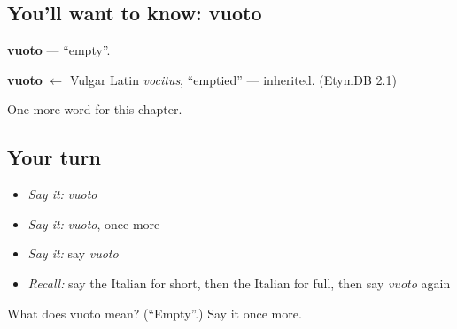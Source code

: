 \subsection*{You'll want to know: vuoto}
\textbf{vuoto} — \textquotedblleft{}empty\textquotedblright{}.

\begin{cousinweb}
\textbf{vuoto} $\leftarrow$ Vulgar Latin \emph{vocitus}, \textquotedblleft{}emptied\textquotedblright{} — inherited. (EtymDB 2.1)
\end{cousinweb}

\begin{grammarlens}[title={What you've built}]
One more word for this chapter.
\end{grammarlens}

\subsection*{Your turn}
\begin{itemize}
\raggedright
  \item \emph{Say it:} \emph{vuoto}
  \item \emph{Say it:} \emph{vuoto}, once more
  \item \emph{Say it:} say \emph{vuoto}
  \item \emph{Recall:} say the Italian for short, then the Italian for full, then say \emph{vuoto} again
\end{itemize}

\begin{tcolorbox}[breakable,colback=teal!4,colframe=teal!35!black,title={Before you move on}]
What does vuoto mean? (\textquotedblleft{}Empty\textquotedblright{}.) Say it once more.
\end{tcolorbox}
